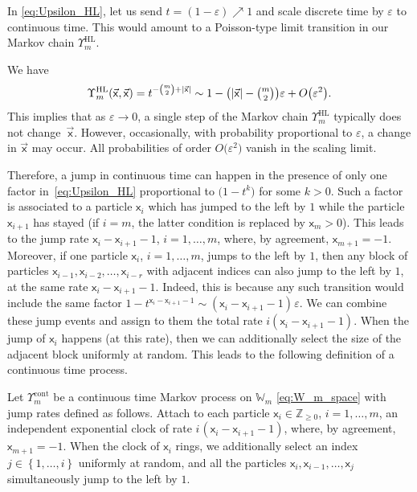 \documentclass[pdftex]{sigma}
\numberwithin{equation}{section}
\begin{document}
In
\eqref{eq:Upsilon_HL},
let us
send $t=(1-\varepsilon)\nearrow 1$ and
scale discrete time
by $\varepsilon$
to continuous time.
This would amount to a Poisson-type
limit transition in our Markov chain
$\Upsilon_m^{\mathrm{HL}}$.

We have
\begin{equation}
	\label{eq:total_jump_rate_HL_cont}
	\Upsilon_m^{\mathrm{HL}}
	(\vec{\mathsf{x}},\vec{\mathsf{x}})=
	t^{-\binom m2+|\vec{\mathsf{x}}|}
	\sim
	1-\big( |\vec{\mathsf{x}}| - \tbinom{m}{2} \big)\varepsilon+
	O\big(\varepsilon^2\big).
\end{equation}
This implies that as $\varepsilon\to0$,
a single step of the Markov chain $\Upsilon_m^{\mathrm{HL}}$
typically does not change~$\vec{\mathsf{x}}$.
However, occasionally, with probability
proportional to $\varepsilon$, a change in $\vec{\mathsf{x}}$
may occur.
All probabilities of order $O\big(\varepsilon^2\big)$
vanish in the scaling limit.

Therefore, a jump in continuous time
can happen in the presence of only one
factor in~\eqref{eq:Upsilon_HL}
proportional to $\big(1-t^k\big)$ for some $k>0$.
Such a factor is associated to a particle
$\mathsf{x}_i$ which has jumped to the left by $1$
while the particle $\mathsf{x}_{i+1}$ has stayed
(if $i=m$, the latter condition
is replaced by $\mathsf{x}_m>0$). This
leads to the jump rate $\mathsf{x}_i-\mathsf{x}_{i+1}-1$,
$i=1,\dots,m $,
where, by agreement, $\mathsf{x}_{m+1}=-1$.
Moreover,
if one particle $\mathsf{x}_i$, $i=1,\dots,m$,
jumps to the left by $1$,
then
any block of particles
$\mathsf{x}_{i-1},\mathsf{x}_{i-2},\dots , \mathsf{x}_{i-r}$
with adjacent indices
can also jump to the left by $1$, at the same rate $\mathsf{x}_i-\mathsf{x}_{i+1}-1$.
Indeed, this is because
any such transition would include the
same factor $1-t^{\mathsf{x}_i-\mathsf{x}_{i+1}-1}\sim (\mathsf{x}_i-\mathsf{x}_{i+1}-1)\hspace{1pt}\varepsilon$.
We can combine these jump events and assign to them the total rate
$i(\mathsf{x}_i-\mathsf{x}_{i+1}-1)$.
When the jump of $\mathsf{x}_i$ happens (at this rate),
then we can additionally select the size of the adjacent block
uniformly at random.
This leads to the following definition of a
continuous time process.

\begin{Definition}
	\label{def:cont_HL}
	Let $\Upsilon_m^{\mathrm{cont}}$ be a continuous
	time Markov process on $\mathbb{W}_m$
	\eqref{eq:W_m_space}
	with jump rates defined
	as follows.
	Attach to each particle $\mathsf{x}_i\in \mathbb{Z}_{\ge0}$,
	$i=1,\dots,m $,
	an independent exponential clock
	of rate $i\hspace{1pt}(\mathsf{x}_i-\mathsf{x}_{i+1}-1)$,
	where, by agreement, $\mathsf{x}_{m+1}=-1$.
	When the clock of $\mathsf{x}_{i}$ rings,
	we additionally
	select an index $j \in \left\{ 1,\dots,i \right\}$
	uniformly at random,
	and all the particles
	$\mathsf{x}_i,\mathsf{x}_{i-1},\dots,\mathsf{x}_j $
	simultaneously
	jump to the left by $1$.
\end{Definition}
\end{document}
